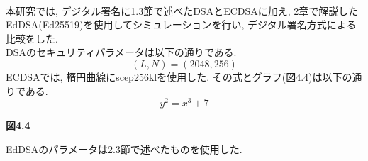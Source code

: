 \\
\indent 本研究では, デジタル署名に1.3節で述べたDSAとECDSAに加え, 
2章で解説したEdDSA(Ed25519)を使用してシミュレーションを行い, 
デジタル署名方式による比較をした. \\ 
\indent DSAのセキュリティパラメータは以下の通りである. \\
\[
  (L,N)=(2048,256)
\]
\indent ECDSAでは, 楕円曲線にscep256klを使用した. 
その式とグラフ(図4.4)は以下の通りである. \\
\[
  y^2 = x^3 + 7 
\]

{\Large\textbf{図4.4}}

\indent EdDSAのパラメータは2.3節で述べたものを使用した.



